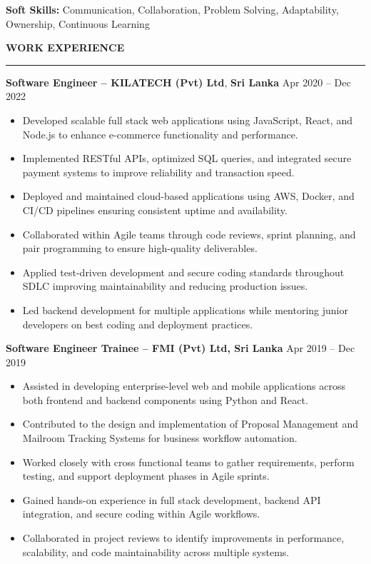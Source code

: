 \documentclass[10pt,letterpaper]{article}
\begin{document}
\textbf{Soft Skills:} Communication, Collaboration, Problem Solving, Adaptability, Ownership, Continuous Learning

\vspace{8pt}

\textbf{WORK EXPERIENCE}\\[-8pt]
\noindent\rule{\textwidth}{1pt}

\vspace{-2pt}

\textbf{Software Engineer -- KILATECH (Pvt) Ltd}, \textbf{Sri Lanka} \hfill Apr 2020 -- Dec 2022

\vspace{-1pt}

\begin{itemize}
\item Developed scalable full stack web applications using JavaScript, React, and Node.js to enhance e-commerce functionality and performance.
\item Implemented RESTful APIs, optimized SQL queries, and integrated secure payment systems to improve reliability and transaction speed.
\item Deployed and maintained cloud-based applications using AWS, Docker, and CI/CD pipelines ensuring consistent uptime and availability.
\item Collaborated within Agile teams through code reviews, sprint planning, and pair programming to ensure high-quality deliverables.
\item Applied test-driven development and secure coding standards throughout SDLC improving maintainability and reducing production issues.
\item Led backend development for multiple applications while mentoring junior developers on best coding and deployment practices.
\end{itemize}

\textbf{Software Engineer Trainee -- FMI (Pvt) Ltd, Sri Lanka} \hfill Apr 2019 -- Dec 2019

\vspace{-1pt}

\begin{itemize}
\item Assisted in developing enterprise-level web and mobile applications across both frontend and backend components using Python and React.
\item Contributed to the design and implementation of Proposal Management and Mailroom Tracking Systems for business workflow automation.
\item Worked closely with cross functional teams to gather requirements, perform testing, and support deployment phases in Agile sprints.
\item Gained hands-on experience in full stack development, backend API integration, and secure coding within Agile workflows.
\item Collaborated in project reviews to identify improvements in performance, scalability, and code maintainability across multiple systems.
\end{itemize}
\end{document}
